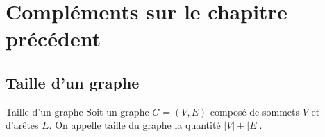 \def\xxactivite{Cours}

\def\xxauteur{P. Bessonnat -- Xavier Pessoles}
\fichefalse \proftrue \tdfalse \courstrue

\def\xxnumchapitre{Chapitre 11 \vspace{.2cm}}

\def\xxchapitre{Introduction aux graphes}

\def\xxcompetences{%
\textsl{%
\textbf{Savoirs et compétences :}\\
\begin{itemize}[label=\ding{112},font=\color{bleuxp}] 
\item Vocabulaire des graphes : graphe orienté, graphe non orienté. Sommet (ou nœud); arc, arête. Boucle. Degré (entrant et sortant). Chemin d’un sommet à un autre. Cycle. Connexité dans les graphes non orientés.
\item Notations : graphe $G=(S,A)$, degrés $d(s)$ (pour un graphe non orienté), $d_{+}(s)$ et  $d_{-}(s)$ (pour un graphe orienté).
\item Pondération d’un graphe. Étiquettes des arcs ou des arêtes d’un graphe. On motive l’ajout d’information à un graphe par des exemples
concrets.
\end{itemize}
}}

\def\xxfigures{
\texttt{[image: fig\_0]} \\
\textit{Représentation ciculaire du métro parisien}
}%



\setlength{\columnseprule}{.1pt}

\vspace{2cm}
\pagestyle{fancy}
\thispagestyle{plain}


\section{Compléments sur le chapitre précédent}

\subsection{Taille d'un graphe}

\begin{defi}{Taille d'un graphe}
Soit un graphe $G=\left(V,E\right)$ composé de sommets $V$ et d'arêtes $E$. On appelle taille du graphe la quantité $|V|+|E|$.
\end{defi}

